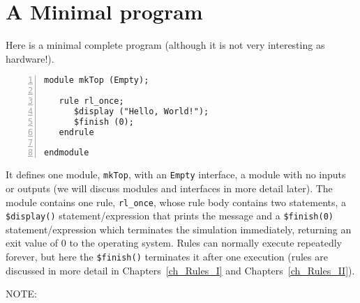 \section{A Minimal {\BSV} program}

\label{Sec_Hello_World}

Here is a minimal complete {\BSV} program (although it is not very
interesting as hardware!).


{\footnotesize
\begin{Verbatim}[frame=single, numbers=left, label=in file Exercises/Ex-03-A-Hello-World/Top.bsv]
module mkTop (Empty);

   rule rl_once;
      $display ("Hello, World!");
      $finish (0);
   endrule
      
endmodule
\end{Verbatim}
}

It defines one module, \verb|mkTop|, with an \verb|Empty| interface,
{\ie} a module with no inputs or outputs (we will discuss modules and
interfaces in more detail later).  The module contains one rule,
\verb|rl_once|, whose rule body contains two statements, a
\verb|$display()| statement/expression that prints the message and a
\verb|$finish(0)| statement/expression which terminates the simulation
immediately, returning an exit value of 0 to the operating system.
Rules can normally execute repeatedly forever, but here the
\verb|$finish()| terminates it after one execution (rules are
discussed in more detail in Chapters~\ref{ch_Rules_I} and
Chapters~\ref{ch_Rules_II}).

\vspace{1ex}

NOTE: 

